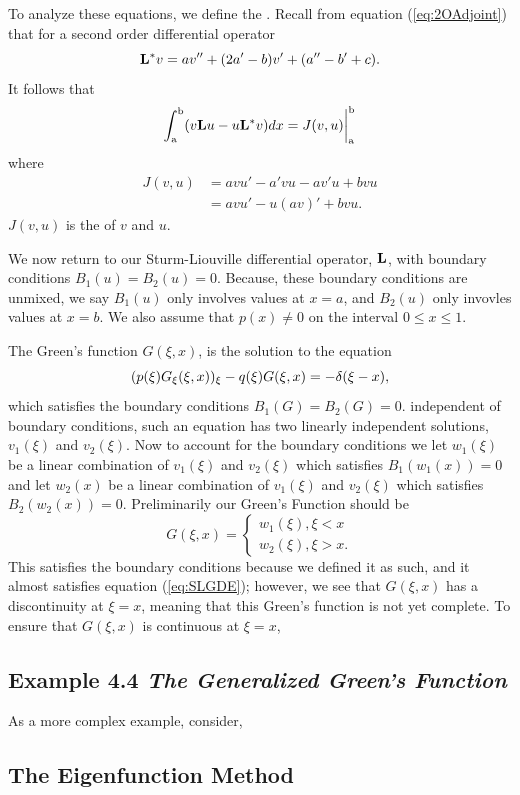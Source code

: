     To analyze these equations, we define the . Recall from equation (\ref{eq:2OAdjoint}) that for a second order differential operator
    \begin{equation*}
        \mathrm{\bf{L^*}} v = av''+(2a'-b)v'+(a''-b'+c).
    \end{equation*}
    It follows that 
    \begin{equation*}
        \int_\mathrm{a}^\mathrm{b} (v\mathrm{\bf{L}} u - u\mathrm{\bf{L^*}} v)dx = J(v,u)\biggr\rvert_{\mathrm{a}}^{\mathrm{b}}
    \end{equation*}
    where
    \begin{equation*}
        \begin{split}
            J(v,u) &= avu'-a'vu-av'u + bvu\\
            &=avu'- u(av)' +bvu.
        \end{split}
    \end{equation*}
    \(J(v,u)\) is the  of \(v\) and \(u\).

    We now return to our Sturm-Liouville differential operator, \(\mathrm{\bf{L}}\), with boundary conditions \(B_1(u)=B_2(u)=0\). Because, these boundary conditions are unmixed, we say \(B_1(u)\) only involves values at \(x=a\), and \(B_2(u)\) only invovles values at \(x=b\). We also assume that \(p(x)\neq 0\) on the interval \(0\leq x\leq 1\). 

    The Green's function \(G(\xi,x)\), is the solution to the equation
    \begin{equation}\label{eq:SLGDE}
        (p(\xi)G_\xi(\xi,x))_\xi-q(\xi)G(\xi,x)=-\delta(\xi-x),
    \end{equation}
    which satisfies the boundary conditions \(B_1(G)=B_2(G)=0\). independent of boundary conditions, such an equation has two linearly independent solutions, \(v_1(\xi)\) and \(v_2(\xi)\). Now to account for the boundary conditions we let \(w_1(\xi)\) be a linear combination of \(v_1(\xi)\) and \(v_2(\xi)\) which satisfies \(B_1(w_1(x)) = 0\) and let \(w_2(x)\) be a linear combination of \(v_1(\xi)\) and \(v_2(\xi)\) which satisfies \(B_2(w_2(x)) = 0\). Preliminarily our Green's Function should be
    \begin{equation}
        G(\xi,x)=\begin{cases}
            w_1(\xi), \xi < x\\
            w_2(\xi), \xi > x.
        \end{cases}
    \end{equation}
    This satisfies the boundary conditions because we defined it as such, and it almost satisfies equation (\ref{eq:SLGDE}); however, we see that \(G(\xi, x)\) has a discontinuity at \(\xi=x\), meaning that this Green's function is not yet complete. To ensure that \(G(\xi,x)\) is continuous at \(\xi=x\), 

\subsection{Example 4.4 \textit{The Generalized Green's Function}}
    As a more complex example, consider, 

\subsection{The Eigenfunction Method}
